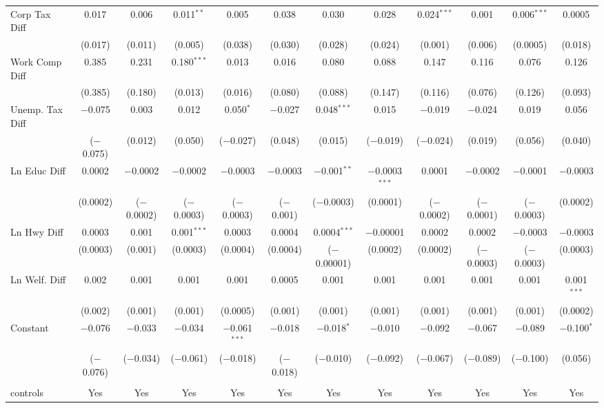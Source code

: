 \begin{table}[!htbp]
\begin{tabular}{@{\extracolsep{5pt}}lccccccccccc}
  Corp Tax Diff & 0.017 & 0.006 & 0.011$^{**}$ & 0.005 & 0.038 & 0.030 & 0.028 & 0.024$^{***}$ & 0.001 & 0.006$^{***}$ & 0.0005 \\ 
  & (0.017) & (0.011) & (0.005) & (0.038) & (0.030) & (0.028) & (0.024) & (0.001) & (0.006) & (0.0005) & (0.018) \\ 
  Work Comp Diff & 0.385 & 0.231 & 0.180$^{***}$ & 0.013 & 0.016 & 0.080 & 0.088 & 0.147 & 0.116 & 0.076 & 0.126 \\ 
  & (0.385) & (0.180) & (0.013) & (0.016) & (0.080) & (0.088) & (0.147) & (0.116) & (0.076) & (0.126) & (0.093) \\ 
  Unemp. Tax Diff & $-$0.075 & 0.003 & 0.012 & 0.050$^{*}$ & $-$0.027 & 0.048$^{***}$ & 0.015 & $-$0.019 & $-$0.024 & 0.019 & 0.056 \\ 
  & ($-$0.075) & (0.012) & (0.050) & ($-$0.027) & (0.048) & (0.015) & ($-$0.019) & ($-$0.024) & (0.019) & (0.056) & (0.040) \\ 
  Ln Educ Diff & 0.0002 & $-$0.0002 & $-$0.0002 & $-$0.0003 & $-$0.0003 & $-$0.001$^{**}$ & $-$0.0003$^{***}$ & 0.0001 & $-$0.0002 & $-$0.0001 & $-$0.0003 \\ 
  & (0.0002) & ($-$0.0002) & ($-$0.0003) & ($-$0.0003) & ($-$0.001) & ($-$0.0003) & (0.0001) & ($-$0.0002) & ($-$0.0001) & ($-$0.0003) & (0.0002) \\ 
  Ln Hwy Diff & 0.0003 & 0.001 & 0.001$^{***}$ & 0.0003 & 0.0004 & 0.0004$^{***}$ & $-$0.00001 & 0.0002 & 0.0002 & $-$0.0003 & $-$0.0003 \\ 
  & (0.0003) & (0.001) & (0.0003) & (0.0004) & (0.0004) & ($-$0.00001) & (0.0002) & (0.0002) & ($-$0.0003) & ($-$0.0003) & (0.0003) \\ 
  Ln Welf. Diff & 0.002 & 0.001 & 0.001 & 0.001 & 0.0005 & 0.001 & 0.001 & 0.001 & 0.001 & 0.001 & 0.001$^{***}$ \\ 
  & (0.002) & (0.001) & (0.001) & (0.0005) & (0.001) & (0.001) & (0.001) & (0.001) & (0.001) & (0.001) & (0.0002) \\ 
  Constant & $-$0.076 & $-$0.033 & $-$0.034 & $-$0.061$^{***}$ & $-$0.018 & $-$0.018$^{*}$ & $-$0.010 & $-$0.092 & $-$0.067 & $-$0.089 & $-$0.100$^{*}$ \\ 
  & ($-$0.076) & ($-$0.034) & ($-$0.061) & ($-$0.018) & ($-$0.018) & ($-$0.010) & ($-$0.092) & ($-$0.067) & ($-$0.089) & ($-$0.100) & (0.056) \\ 
 \hline \\[-1.8ex] 
controls & Yes & Yes & Yes & Yes & Yes & Yes & Yes & Yes & Yes & Yes & Yes \\ 

\end{tabular}
\end{table}
